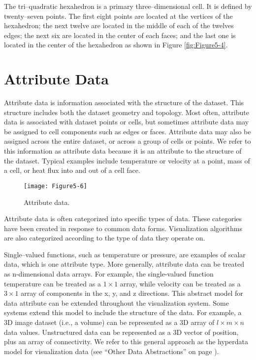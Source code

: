 \begin{description}[leftmargin=0cm,labelindent=0cm]
\item[Tri--Quadratic Hexahedron.\index{cell!tri--quadratic hexahedron}] The tri--quadratic hexahedron is a primary three--dimensional cell. It is defined by twenty--seven points. The first eight points are located at the vertices of the hexahedron; the next twelve are located in the middle of each of the twelves edges; the next six are located in the center of each faces; and the last one is located in the center of the hexahedron as shown in Figure \ref{fig:Figure5-4}.

\section{Attribute Data}

Attribute data is information associated with the structure of the dataset. This structure includes both the dataset geometry and topology. Most often, attribute data is associated with dataset points or cells, but sometimes attribute data may be assigned to cell components such as edges or faces. Attribute data may also be assigned across the entire dataset, or across a group of cells or points. We refer to this information as attribute data because it is an attribute to the structure of the dataset. Typical examples include temperature or velocity at a point, mass of a cell, or heat flux into and out of a cell face.

\end{description}

\begin{figure}[!htb]
	\centering
	\texttt{[image: Figure5-6]}
	\caption{Attribute data.}
	\label{fig:Figure5-6}
\end{figure}

Attribute data is often categorized into specific types of data. These categories have been created in response to common data forms. Visualization algorithms are also categorized according to the type of data they operate on.

Single--valued functions, such as temperature or pressure, are examples of scalar data, which is one attribute type. More generally, attribute data can be treated as n-dimensional data arrays. For example, the single-valued function temperature can be treated as a $1 \times 1$ array, while velocity can be treated as a $3 \times 1$ array of components in the x, y, and z directions. This abstract model for data attribute can be extended throughout the visualization system. Some systems extend this model to include the structure of the data. For example, a 3D image dataset (i.e., a volume) can be represented as a 3D array of $l \times m \times n$ data values. Unstructured data can be represented as a 3D vector of position, plus an array of connectivity. We refer to this general approach as the hyperdata model for visualization data (see ``Other Data Abstractions'' on page \pageref{sec:other_data_abstractions}).

